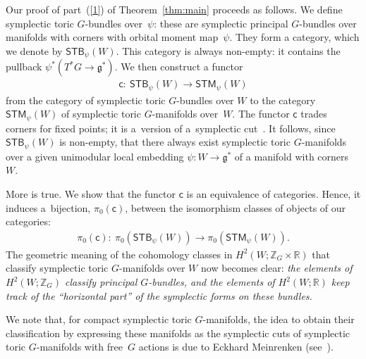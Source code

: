 \documentclass[pdftex]{sigma}
\numberwithin{equation}{section}
\begin{document}
Our proof of  part~(\ref{1}) of Theorem~\ref{thm:main} proceeds as follows.
We def\/ine symplectic toric $G$-bundles over~$\psi$:
these are
symplectic principal $G$-bundles over manifolds with corners
with orbital moment map~$\psi$.
They form a category, which we denote by ${\textsf{STB}}_\psi (W)$.
This category is always non-empty:
it contains the pullback $\psi^*(T^*G\to {\mathfrak g}^*)$.
We then construct a functor
\begin{gather} \label{collapse 0}
 {\textsf{c}} \colon \  {\textsf{STB}}_{\psi}(W)   \to
                   {\textsf{STM}}_{\psi}(W)
\end{gather}
from the category of symplectic toric $G$-bundles over $W$ to the
category ${\textsf{STM}}_{\psi}(W)$ of symplectic toric $G$-manifolds over~$W$.
The functor
${\textsf{c}}$ trades corners for f\/ixed points; it is a~version of a~symplectic cut~\cite{Lcuts}.  It follows, since
${\textsf{STB}}_\psi (W)$ is non-empty, that there always
exist symplectic toric $G$-manifolds
over a given unimodular local embedding $\psi\colon W \to {\mathfrak g}^*$
of a manifold with corners~$W$.

More is true.  We show that the functor ${\textsf{c}}$ is an
equivalence of categories. Hence, it induces a~bijection,
$\pi_0({\textsf{c}})$, between the isomorphism classes of objects of our
categories:
\begin{gather*}
\pi_0({\textsf{c}}) \colon \  \pi_0({\textsf{STB}}_\psi (W))   \to
                  \pi_0({\textsf{STM}}_\psi(W)).
\end{gather*}
The geometric meaning of the cohomology classes in $H^2 (W; {\mathbb Z}_G \times {\mathbb R})$
that classify symplectic toric $G$-manifolds over $W$ now becomes clear:
\emph{the elements of $H^2(W; {\mathbb Z}_G)$ classify principal $G$-bundles,
and the elements of $H^2(W; {\mathbb R})$
keep track of the ``horizontal part'' of the symplectic forms on these bundles.}

We note that, for compact symplectic toric $G$-manifolds,
the idea to obtain their classif\/ication by expressing these manifolds
as the symplectic cuts of symplectic toric $G$-manifolds with free~$G$ actions
is due to Eckhard Meinrenken (see~\cite[Chapter~7, Section~5]{Meinrenken}).
\end{document}
